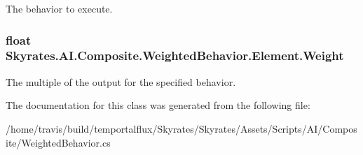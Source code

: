 The behavior to execute. 

\hypertarget{class_skyrates_1_1_a_i_1_1_composite_1_1_weighted_behavior_1_1_element_a7c8737da0c01c16ed847fdd1f1f2c961}{
\subsubsection[{Weight}]{\setlength{\rightskip}{0pt plus 5cm}float Skyrates.\-A\-I.\-Composite.\-Weighted\-Behavior.\-Element.\-Weight}}\label{class_skyrates_1_1_a_i_1_1_composite_1_1_weighted_behavior_1_1_element_a7c8737da0c01c16ed847fdd1f1f2c961}


The multiple of the output for the specified behavior. 



The documentation for this class was generated from the following file\-:\begin{DoxyCompactItemize}
\item 
/home/travis/build/temportalflux/\-Skyrates/\-Skyrates/\-Assets/\-Scripts/\-A\-I/\-Composite/Weighted\-Behavior.\-cs\end{DoxyCompactItemize}
